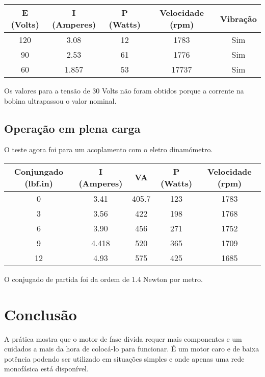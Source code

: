 \documentclass[paper=a4, fontsize=11pt]{article}
\begin{document}
\begin{center}
    \begin{tabular}{c|c|c|c|c}
            E (Volts) & I (Amperes) & P (Watts) & Velocidade (rpm) & Vibração \\
            \hline
            120 & 3.08 & 12 & 1783 & Sim \\
            90 & 2.53 & 61 & 1776 & Sim \\
            60 & 1.857 & 53 & 17737 & Sim \\
    \end{tabular}
\end{center}

Os valores para a tensão de 30 Volts não foram obtidos porque a corrente
na bobina ultrapassou o valor nominal.

\subsection{Operação em plena carga}

O teste agora foi para um acoplamento com o eletro dinamómetro.

\begin{center}
    \begin{tabular}{c|c|c|c|c}
            Conjungado (lbf.in) & I (Amperes) & VA & P (Watts) & Velocidade (rpm) \\
            \hline
            0 & 3.41 & 405.7 & 123 & 1783 \\
            3 & 3.56 & 422 & 198 & 1768 \\
            6 & 3.90 & 456 & 271 & 1752 \\
            9 & 4.418 & 520 & 365 & 1709 \\
            12 & 4.93 & 575 & 425 & 1685 \\
    \end{tabular}
\end{center}

O conjugado de partida foi da ordem de 1.4 Newton por metro.

\section{Conclusão}

A prática mostra que o motor de fase divida requer mais componentes 
e um cuidados a mais da hora de colocá-lo para funcionar. 
É um motor caro e de baixa potência podendo ser utilizado em 
situações simples e onde apenas uma rede monofásica está disponível.
\end{document}
